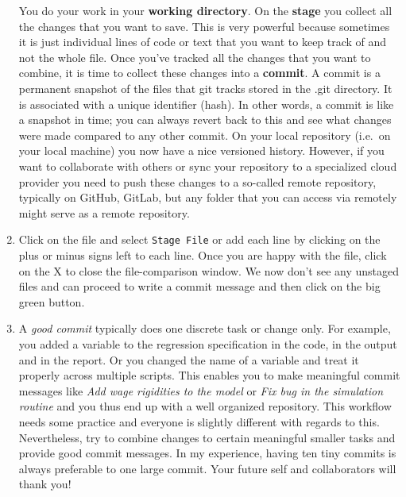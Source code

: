 \begin{enumerate}
\begin{tikzpicture}[mypostaction/.style 2 args={decoration={text align={left indent=#1}, text along path, text={#2}},decorate}]
\end{tikzpicture}

You do your work in your \textbf{working directory}.
On the \textbf{stage} you collect all the changes that you want to save.
This is very powerful because sometimes it is just individual lines of code or text that you want to keep track of and not the whole file.
Once you've tracked all the changes that you want to combine, it is time to collect these changes into a \textbf{commit}.
A commit is a permanent snapshot of the files that git tracks stored in the {.git} directory.
It is associated with a unique identifier (hash).
In other words, a commit is like a snapshot in time; you can always revert back to this and see what changes were made compared to any other commit.
On your local repository (i.e.\ on your local machine) you now have a nice versioned history.
However, if you want to collaborate with others or sync your repository to a specialized cloud provider you need to push these changes to a so-called remote repository,
  typically on GitHub, GitLab, but any folder that you can access via remotely might serve as a remote repository.

\item
Click on the file and select \texttt{Stage File} or add each line by clicking on the plus or minus signs left to each line.
Once you are happy with the file, click on the X to close the file-comparison window.
We now don't see any unstaged files and can proceed to write a commit message and then click on the big green button.

\item
A \emph{good commit} typically does one discrete task or change only.
For example, you added a variable to the regression specification in the code, in the output and in the report.
Or you changed the name of a variable and treat it properly across multiple scripts.
This enables you to make meaningful commit messages like \emph{Add wage rigidities to the model} or \emph{Fix bug in the simulation routine}
  and you thus end up with a well organized repository.
This workflow needs some practice and everyone is slightly different with regards to this.
Nevertheless, try to combine changes to certain meaningful smaller tasks and provide good commit messages.
In my experience, having ten tiny commits is always preferable to one large commit.
Your future self and collaborators will thank you!


\end{enumerate}
